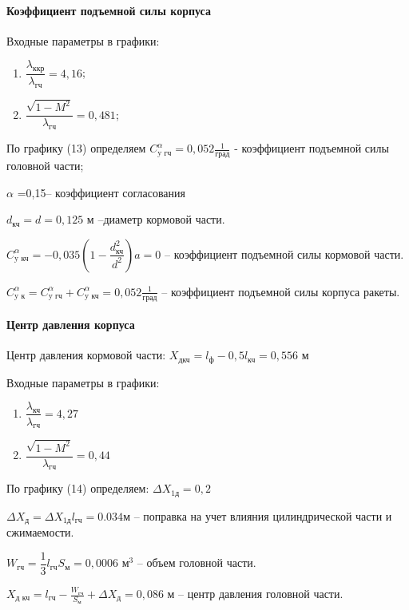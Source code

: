 \clearpage
\paragraph{Коэффициент подъемной силы корпуса}

Входные параметры в графики:
\begin{enumerate}
	\item $ \dfrac{\lambda_\text{ккр}}{\lambda_\text{гч}} = 4,16$;
	\item $ \dfrac{\sqrt{1-M^2}}{\lambda_\text{гч}} = 0,481$;
\end{enumerate}

По графику (13) \cite{Astakhova} определяем $C_\text{y гч}^\alpha = 0,052 \frac{1}{\text{град}} $ - коэффициент подъемной силы головной части;

$\alpha$ =0,15– коэффициент согласования

$d_\text{кч}=d=0,125$ м –диаметр кормовой части.

$C_\text{y кч}^\alpha=-0,035 \left(1-\dfrac{d_\text{кч}^2}{d^2} \right) a=0$ – коэффициент подъемной силы кормовой части.

$C_\text{y к}^\alpha=C_\text{y гч}^\alpha + C_\text{y кч}^\alpha = 0,052 \frac{1}{\text{град}}$ – коэффициент подъемной силы корпуса ракеты.

\paragraph{Центр давления корпуса}

Центр давления кормовой части: $X_\text{дкч}=l_\text{ф}- 0,5 l_\text{кч}=0,556$ м

Входные параметры в графики:
\begin{enumerate}
	\item $\dfrac{\lambda_\text{кч}} {\lambda_\text{гч}} =4,27$
	\item $\dfrac{\sqrt{1-M^2}}{\lambda_\text{гч}} =0,44$
\end{enumerate}

По графику (14) \cite{Astakhova} определяем: $\Delta X_\text{1д}=0,2$

$\Delta X_\text{д}= \Delta X_\text{1д} l_\text{гч}=0.034 м$ – поправка на учет влияния цилиндрической части и сжимаемости.

$W_\text{гч}=\dfrac{1}{3} l_\text{гч} S_\text{м}=0,0006 \text{ м}^3$ – объем головной части.

$X_\text{д кч}=l_\text{гч}- \frac{W_\text{гч}}{S_\text{м}} + \Delta X_\text{д}=0,086$ м – центр давления головной части.

